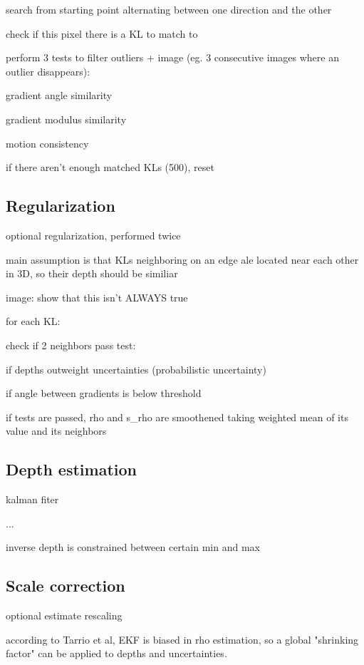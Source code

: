  search from starting point alternating between one direction and the other

 check if this pixel there is a KL to match to

 perform 3 tests to filter outliers + image (eg. 3 consecutive images where an outlier disappears):

  gradient angle similarity

  gradient modulus similarity

  motion consistency

 if there aren't enough matched KLs (500), reset

\subsection{Regularization}

 optional regularization, performed twice

 main assumption is that KLs neighboring on an edge ale located near each other in 3D, so their depth should be similiar

 image: show that this isn't ALWAYS true

 for each KL:

  check if 2 neighbors pass test:

   if depths outweight uncertainties (probabilistic uncertainty)

   if angle between gradients is below threshold

  if tests are passed, rho and s\_rho are smoothened taking weighted mean of its value and its neighbors

\subsection{Depth estimation}

 kalman fiter

 ...

 inverse depth is constrained between certain min and max

\subsection{Scale correction}


 optional estimate rescaling

 according to Tarrio et al, EKF is biased in rho estimation, so a global "shrinking factor" can be applied to depths and uncertainties.









